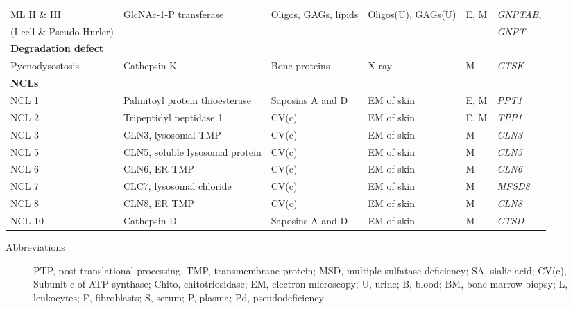 \documentclass[landscape]{article}
\begin{document}
\begin{longtable}{llllll}
ML II \& III & GlcNAc-1-P transferase & Oligos, GAGs, lipids & Oligos(U), GAGs(U) & E\footnotemark, M & \emph{GNPTAB},\\
(I-cell \& Pseudo Hurler) &  &  &  &  & \emph{GNPT}\\
\hline
\textbf{Degradation defect} &  &  &  &  & \\
Pycnodysostosis & Cathepsin K & Bone proteins & X-ray & M & \emph{CTSK}\\
\hline
\textbf{NCLs} &  &  &  &  & \\
NCL 1 & Palmitoyl protein thioesterase & Saposins A and D & EM of skin & E, M & \emph{PPT1}\\
NCL 2 & Tripeptidyl peptidase 1 & CV(c) & EM of skin & E, M & \emph{TPP1}\\
NCL 3 & CLN3, lysosomal TMP & CV(c) & EM of skin & M & \emph{CLN3}\\
NCL 5 & CLN5, soluble lysosomal protein & CV(c) & EM of skin & M & \emph{CLN5}\\
NCL 6 & CLN6, ER TMP & CV(c) & EM of skin & M & \emph{CLN6}\\
NCL 7 & CLC7, lysosomal chloride & CV(c) & EM of skin & M & \emph{MFSD8}\\
NCL 8 & CLN8, ER TMP & CV(c) & EM of skin & M & \emph{CLN8}\\
NCL 10 & Cathepsin D & Saposins A and D & EM of skin & M & \emph{CTSD}\\
\end{longtable}
\begin{description}
\item[{Abbreviations}] PTP, post-translational processing, TMP,
transmembrane protein; MSD, multiple sulfatase deficiency; SA,
sialic acid; CV(c), Subunit c of ATP synthase; Chito,
chitotriosidase; EM, electron microscopy; U, urine; B, blood; BM,
bone marrow biopsy; L, leukocytes; F, fibroblasts; S, serum; P,
plasma; Pd, pseudodeficiency
\end{description}
\end{document}
